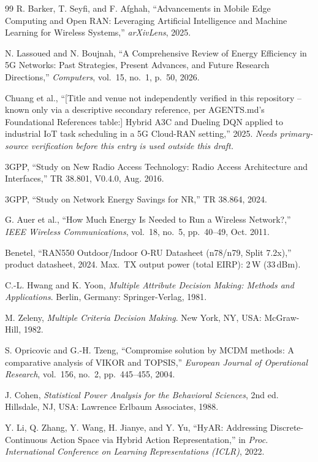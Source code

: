 \begin{thebibliography}{99}
R. Barker, T. Seyfi, and F. Afghah, ``Advancements in Mobile Edge Computing
and Open RAN: Leveraging Artificial Intelligence and Machine Learning for
Wireless Systems,'' \emph{arXivLens}, 2025.

N. Lassoued and N. Boujnah, ``A Comprehensive Review of Energy Efficiency in
5G Networks: Past Strategies, Present Advances, and Future Research
Directions,'' \emph{Computers}, vol.~15, no.~1, p.~50, 2026.

Chuang et al., ``[Title and venue not independently verified in this
repository -- known only via a descriptive secondary reference, per
AGENTS.md's Foundational References table:] Hybrid A3C and Dueling DQN
applied to industrial IoT task scheduling in a 5G Cloud-RAN setting,''
2025. \emph{Needs primary-source verification before this entry is used
outside this draft.}

3GPP, ``Study on New Radio Access Technology: Radio Access Architecture and
Interfaces,'' TR 38.801, V0.4.0, Aug. 2016.

3GPP, ``Study on Network Energy Savings for NR,'' TR 38.864, 2024.

G. Auer et al., ``How Much Energy Is Needed to Run a Wireless Network?,''
\emph{IEEE Wireless Communications}, vol.~18, no.~5, pp.~40--49, Oct. 2011.

Benetel, ``RAN550 Outdoor/Indoor O-RU Datasheet (n78/n79, Split 7.2x),''
product datasheet, 2024. Max.\ TX output power (total EIRP): 2\,W (33\,dBm).

C.-L. Hwang and K. Yoon, \emph{Multiple Attribute Decision Making: Methods
and Applications}. Berlin, Germany: Springer-Verlag, 1981.

M. Zeleny, \emph{Multiple Criteria Decision Making}. New York, NY, USA:
McGraw-Hill, 1982.

S. Opricovic and G.-H. Tzeng, ``Compromise solution by MCDM methods: A
comparative analysis of VIKOR and TOPSIS,'' \emph{European Journal of
Operational Research}, vol.~156, no.~2, pp.~445--455, 2004.

J. Cohen, \emph{Statistical Power Analysis for the Behavioral Sciences},
2nd ed. Hillsdale, NJ, USA: Lawrence Erlbaum Associates, 1988.

Y. Li, Q. Zhang, Y. Wang, H. Jianye, and Y. Yu, ``HyAR: Addressing
Discrete-Continuous Action Space via Hybrid Action Representation,'' in
\emph{Proc. International Conference on Learning Representations (ICLR)},
2022.

\end{thebibliography}
